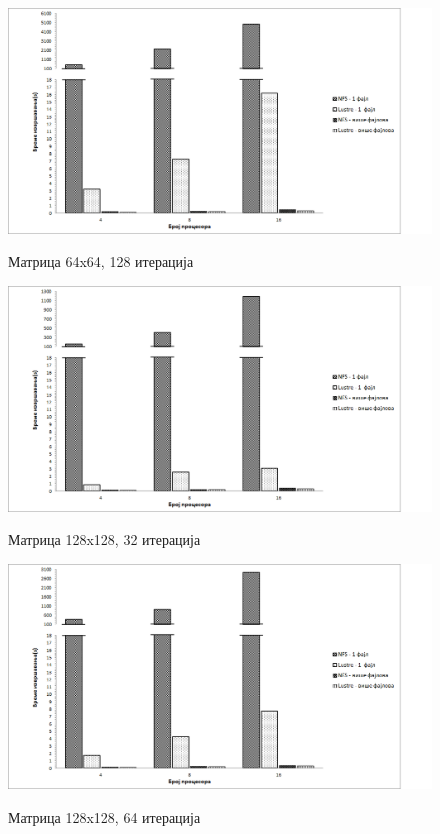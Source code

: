       \begin{figure}[H]
        \centering
            \includegraphics[width=1\textwidth]{slike/results/64_128.png}\\[1cm]
         \caption{Матрица 64x64, 128 итерација}
      \end{figure}
      
      \begin{figure}[H]
        \centering
            \includegraphics[width=1\textwidth]{slike/results/128_32.png}\\[1cm]
        \caption{Матрица 128x128, 32 итерација}
      \end{figure}
      
      \begin{figure}[H]
        \centering
            \includegraphics[width=1\textwidth]{slike/results/128_64.png}\\[1cm]
        \caption{Матрица 128x128, 64 итерација}
      \end{figure}
      
